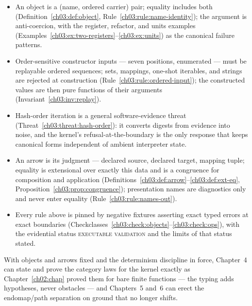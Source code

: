 \begin{itemize}
\item An object is a (name, ordered carrier) pair; equality includes both
(Definition~\ref{ch03:def:object}, Rule~\ref{ch03:rule:name-identity});
the argument is anti-coercion, with the register, refactor, and units
examples (Examples~\ref{ch03:ex:two-registers}--\ref{ch03:ex:units}) as
the canonical failure patterns.
\item Order-sensitive constructor inputs --- seven positions, enumerated
--- must be replayable ordered sequences; sets, mappings, one-shot
iterables, and strings are rejected at construction
(Rule~\ref{ch03:rule:ordered-input}); the constructed values are then
pure functions of their arguments (Invariant~\ref{ch03:inv:replay}).
\item Hash-order iteration is a general software-evidence threat
(Threat~\ref{ch03:threat:hash-order}): it converts digests from evidence
into noise, and the kernel's refusal-at-the-boundary is the only response
that keeps canonical forms independent of ambient interpreter state.
\item An arrow is its judgment --- declared source, declared target,
mapping tuple; equality is extensional over exactly this data and is a
congruence for composition and application
(Definitions~\ref{ch03:def:arrow}--\ref{ch03:def:ext-eq},
Proposition~\ref{ch03:prop:congruence}); presentation names are
diagnostics only and never enter equality
(Rule~\ref{ch03:rule:names-out}).
\item Every rule above is pinned by negative fixtures asserting exact
typed errors at exact boundaries
(Checkclasses~\ref{ch03:check:objects}--\ref{ch03:check:ops}), with the
evidential status \textsc{executable validation} and the limits of that
status stated.
\end{itemize}

With objects and arrows fixed and the determinism discipline in force,
Chapter~4 can state and prove the category laws for the kernel exactly as
Chapter~\ref{ch02:chap} proved them for bare finite functions --- the
typing adds hypotheses, never obstacles --- and Chapters~5 and~6 can
erect the endomap/path separation on ground that no longer shifts.
